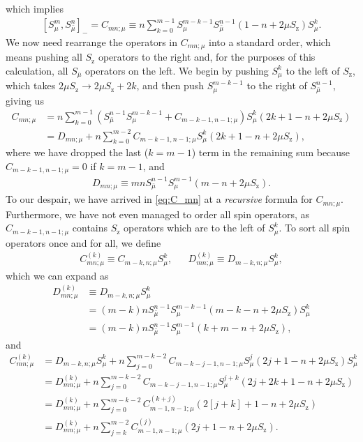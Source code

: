\documentclass[aps,notitlepage,nofootinbib,11pt]{revtex4-1}
\newcommand{\p}[1]{\left(#1\right)} %
\renewcommand{\sp}[1]{\left[#1\right]} %
\newcommand{\z}{\text{z}}
\newcommand{\bmu}{{\bar\mu}}
\newcommand{\1}{\mathds{1}}
\begin{document}
which implies
\begin{align}
  \sp{S_\mu^m, S_\bmu^n}_-
  = C_{mn;\mu}
  \equiv n \sum_{k=0}^{m-1} S_\mu^{m-k-1} S_\bmu^{n-1}
  \p{1 - n + 2\mu S_\z} S_\mu^k.
\end{align}
We now need rearrange the operators in $C_{mn;\mu}$ into a standard
order, which means pushing all $S_\z$ operators to the right and, for
the purposes of this calculation, all $S_\bmu$ operators on the left.
We begin by pushing $S_\mu^k$ to the left of $S_\z$, which takes
$2\mu S_\z\to 2\mu S_\z+2k$, and then push $S_\mu^{m-k-1}$ to the
right of $S_\bmu^{n-1}$, giving us
\begin{align}
  C_{mn;\mu}
  &= n \sum_{k=0}^{m-1}
  \p{S_\bmu^{n-1} S_\mu^{m-k-1} + C_{m-k-1,n-1;\mu}} S_\mu^k
  \p{2k + 1 - n + 2\mu S_\z} \\
  &= D_{mn;\mu}
  + n \sum_{k=0}^{m-2} C_{m-k-1,n-1;\mu}
  S_\mu^k \p{2k + 1 - n + 2\mu S_\z},
  \label{eq:C_mn}
\end{align}
where we have dropped the last ($k=m-1$) term in the remaining sum
because $C_{m-k-1,n-1;\mu}=0$ if $k=m-1$, and
\begin{align}
  D_{mn;\mu}
  \equiv mn S_\bmu^{n-1} S_\mu^{m-1} \p{m - n + 2\mu S_\z}.
  \label{eq:D_mn}
\end{align}
To our despair, we have arrived in \eqref{eq:C_mn} at a {\it
  recursive} formula for $C_{mn;\mu}$.  Furthermore, we have not even
managed to order all spin operators, as $C_{m-k-1,n-1;\mu}$ contains
$S_\z$ operators which are to the left of $S_\mu^k$.  To sort all spin
operators once and for all, we define
\begin{align}
  C_{mn;\mu}^{(k)} \equiv C_{m-k,n;\mu} S_\mu^k,
  &&
  D_{mn;\mu}^{(k)} \equiv D_{m-k,n;\mu} S_\mu^k,
\end{align}
which we can expand as
\begin{align}
  D_{mn;\mu}^{(k)}
  &\equiv D_{m-k,n;\mu}S_\mu^k \\
  &= \p{m-k}n S_\bmu^{n-1} S_\mu^{m-k-1}
  \p{m-k-n+2\mu S_\z} S_\mu^k \\
  &= \p{m-k}n S_\bmu^{n-1} S_\mu^{m-1} \p{k+m-n+2\mu S_\z},
  \label{eq:D_mn_k}
\end{align}
and
\begin{align}
  C_{mn;\mu}^{(k)}
  &= D_{m-k,n;\mu} S_\mu^k + n \sum_{j=0}^{m-k-2}
  C_{m-k-j-1,n-1;\mu} S_\mu^j \p{2j+1-n+2\mu S_\z} S_\mu^k \\
  &= D_{mn;\mu}^{(k)} + n \sum_{j=0}^{m-k-2}
  C_{m-k-j-1,n-1;\mu} S_\mu^{j+k} \p{2j+2k+1-n+2\mu S_\z} \\
  &= D_{mn;\mu}^{(k)} + n \sum_{j=0}^{m-k-2}
  C_{m-1,n-1;\mu}^{(k+j)} \p{2\sp{j+k}+1-n+2\mu S_\z} \\
  &= D_{mn;\mu}^{(k)} + n \sum_{j=k}^{m-2}
  C_{m-1,n-1;\mu}^{(j)} \p{2j+1-n+2\mu S_\z}.
  \label{eq:C_mn_k}
\end{align}
\end{document}
